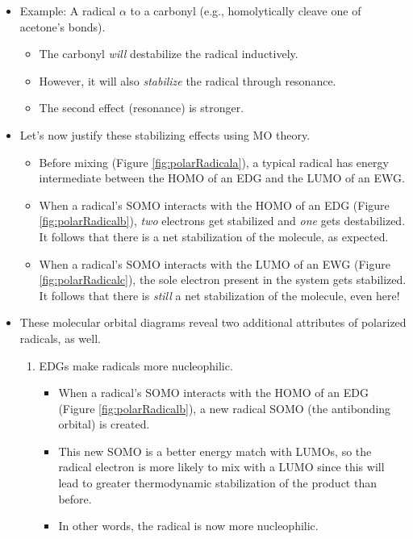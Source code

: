 \documentclass[../notes.tex]{subfiles}
\begin{document}
\begin{itemize}
\begin{itemize}
        \item Example: A radical $\alpha$ to a carbonyl (e.g., homolytically cleave one of acetone's  bonds).
        \begin{itemize}
            \item The carbonyl \emph{will} destabilize the radical inductively.
            \item However, it will also \emph{stabilize} the radical through resonance.
            \item The second effect (resonance) is stronger.
        \end{itemize}
        \item Let's now justify these stabilizing effects using MO theory.
        \begin{itemize}
            \item Before mixing (Figure \ref{fig:polarRadicala}), a typical radical has energy intermediate between the HOMO of an EDG and the LUMO of an EWG.
            \item When a radical's SOMO interacts with the HOMO of an EDG (Figure \ref{fig:polarRadicalb}), \emph{two} electrons get stabilized and \emph{one} gets destabilized. It follows that there is a net stabilization of the molecule, as expected.
            \item When a radical's SOMO interacts with the LUMO of an EWG (Figure \ref{fig:polarRadicalc}), the sole electron present in the system gets stabilized. It follows that there is \emph{still} a net stabilization of the molecule, even here!
        \end{itemize}
        \item These molecular orbital diagrams reveal two additional attributes of polarized radicals, as well.
        \begin{enumerate}
            \item EDGs make radicals more nucleophilic.
            \begin{itemize}
                \item When a radical's SOMO interacts with the HOMO of an EDG (Figure \ref{fig:polarRadicalb}), a new radical SOMO (the antibonding orbital) is created.
                \item This new SOMO is a better energy match with LUMOs, so the radical electron is more likely to mix with a LUMO since this will lead to greater thermodynamic stabilization of the product than before.
                \item In other words, the radical is now more nucleophilic.

\end{itemize}
\end{enumerate}
\end{itemize}
\end{itemize}
\end{document}

